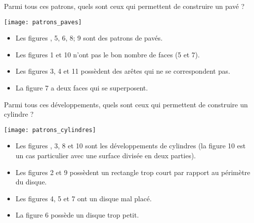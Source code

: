 
\medskip


\begin{exercice} %
   Parmi tous ces patrons, quels sont ceux qui permettent de construire un pavé ?
   \begin{center}
      \texttt{[image: patrons\_paves]}
   \end{center}
\end{exercice}

\begin{corrige}
   \begin{itemize}
      \item Les figures {, 5, 6, 8; 9} sont des patrons de pavés.
      \item Les figures 1 et 10 n'ont pas le bon nombre de faces (5 et 7).
      \item Les figures 3, 4 et 11 possèdent des arêtes qui ne se correspondent pas.
      \item La figure 7 a deux faces qui se superposent.
   \end{itemize}
\end{corrige}

\medskip


\begin{exercice} %
   Parmi tous ces développements, quels sont ceux qui permettent de construire un cylindre ? \smallskip
   \begin{center}
      \texttt{[image: patrons\_cylindres]}
   \end{center}
\end{exercice}

\begin{corrige}
   \begin{itemize}
      \item Les figures {, 3, 8 et 10 sont les développements de cylindres} (la figure 10 est un cas particulier avec une surface divisée en deux parties).
      \item Les figures 2 et 9 possèdent un rectangle trop court par rapport au périmètre du disque.
      \item Les figures 4, 5 et 7 ont un disque mal placé.
      \item La figure 6 possède un disque trop petit.
   \end{itemize}
\end{corrige}


\Recreation


